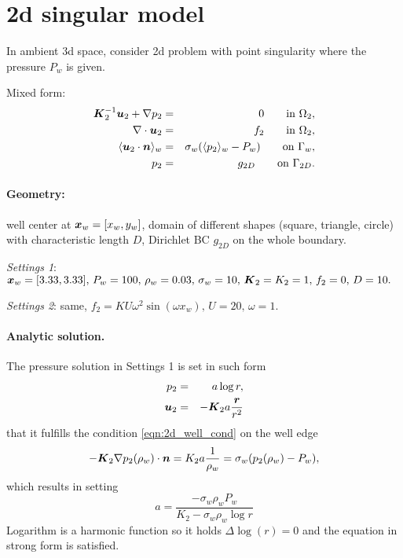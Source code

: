 


\usepackage{array}  %




\section{2d singular model}

In ambient 3d space, consider 2d problem with point singularity where the pressure $P_w$ is given.
  
  Mixed form:
  \begin{eqnarray}
\mathbf{\boldsymbol{K}}_2^{-1}\mathbf{\boldsymbol{u}}_2 + \nabla p_2 &=& 0 \qquad \textrm{in } \Omega_2, \label{eqn:2d_darcy_law}\\
\nabla \cdot \mathbf{\boldsymbol{u}}_2 &=& f_2 \qquad \textrm{in } \Omega_2, \label{eqn:2d_continuity}\\
\langle\mathbf{\boldsymbol{u}}_2 \cdot \mathbf{\boldsymbol{n}}\rangle_w &=& \sigma_w (\langle p_2\rangle_w - P_w) \qquad \textrm{on } \Gamma_w,\label{eqn:2d_well_cond}\\
p_2 &=& g_{2D} \qquad \textrm{on } \Gamma_{2D}.
  \end{eqnarray}
  
  \paragraph{Geometry:} well center at $\mathbf{\boldsymbol{x}}_w=[x_w,y_w]$, domain of different shapes (square, triangle, circle) with characteristic length $D$, Dirichlet BC $g_{2D}$ on the whole boundary.
  
  \emph{Settings 1}: $\mathbf{\boldsymbol{x}}_w=[3.33,3.33],\, P_w = 100,\, \rho_w=0.03,\, \sigma_w=10,\, \mathbf{\boldsymbol{K}}_2=K_2=1,\, f_2=0,\, D=10.$
  
  \emph{Settings 2}: same, $f_2=KU\omega^2\sin(\omega x_w),\, U=20,\, \omega=1.$
  
  \paragraph{Analytic solution.} The pressure solution in Settings 1 is set in such form 
  \begin{eqnarray}
      p_2 &=& a\log r,\label{eqn:2d_press_sol1}\\
      \mathbf{\boldsymbol{u}}_2 &=& -\mathbf{\boldsymbol{K}}_2 a \frac{\mathbf{\boldsymbol{r}}}{r^2} \label{eqn:2d_vel_sol1}
  \end{eqnarray} 
  that it fulfills the condition \eqref{eqn:2d_well_cond} on the well edge
  \[ -\mathbf{\boldsymbol{K}}_2\nabla p_2(\rho_w) \cdot \mathbf{\boldsymbol{n}} = K_2a\frac{1}{\rho_w} = \sigma_w(p_2(\rho_w) - P_w),\]
  which results in setting
  \[a=\frac{-\sigma_w\rho_w P_w}{K_2 - \sigma_w\rho_w\log r}\]
  Logarithm is a harmonic function so it holds $\Delta \log(r) = 0$ and the equation in strong form is satisfied.
  
